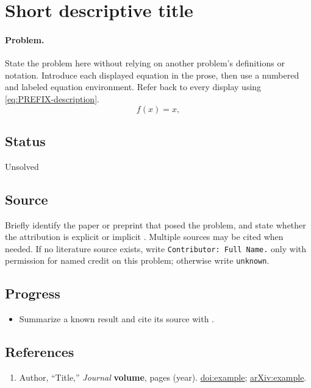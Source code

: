 \section{Short descriptive title}
\label{sec:problem-PREFIX}

\paragraph{Problem.}
State the problem here without relying on another problem's definitions or
notation.  Introduce each displayed equation in the prose, then use a numbered
and labeled equation environment.  Refer back to every display using
\eqref{eq:PREFIX-description}.
\begin{equation}
  f(x)=x,
  \label{eq:PREFIX-description}
\end{equation}

\subsection*{Status}

Unsolved

\subsection*{Source}

Briefly identify the paper or preprint that posed the problem, and state
whether the attribution is explicit or implicit
.  Multiple sources may be cited when
needed.  If no literature source exists, write \texttt{Contributor: Full
Name.} only with permission for named credit on this problem; otherwise
write \texttt{unknown}.

\subsection*{Progress}

\begin{itemize}
  \item Summarize a known result and cite its source with
  .
\end{itemize}

\subsection*{References}

\begin{enumerate}[label={},leftmargin=4.8em,labelsep=0.5em]
  \footnotesize
  \item[\textup{[AutYY]}]\label{ref:PREFIX-source}
  Author, ``Title,'' \emph{Journal} \textbf{volume}, pages (year).
  \href{https://doi.org/example}{doi:example};
  \href{https://arxiv.org/abs/example}{arXiv:example}.
\end{enumerate}

